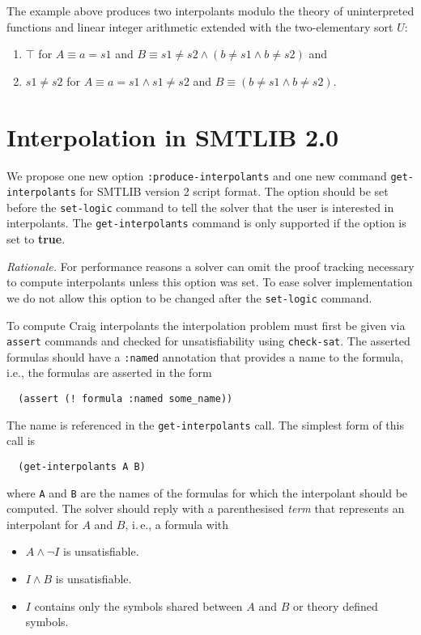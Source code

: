 \documentclass[a4paper,12pt]{article}
\begin{document}
The example above produces two interpolants modulo the theory of uninterpreted
functions and linear integer arithmetic extended with the two-elementary sort
$U$:
\begin{enumerate}
\item $\top$ for $A\equiv a = s1$ and $B\equiv s1\ne s2\wedge(b\ne s1\wedge
  b\ne s2)$ and
\item $s1 \ne s2$ for $A\equiv a = s1\wedge s1\ne s2$ and $B\equiv(b\ne
  s1\wedge b\ne s2)$.
\end{enumerate}

\section {Interpolation in SMTLIB 2.0}

We propose one new option \texttt{:produce-interpolants} and one new
command \texttt{get-interpolants} for SMTLIB version 2 script format.
The option should be set before the \texttt{set-logic} command to tell
the solver that the user is interested in interpolants.  The
\texttt{get-interpolants} command is only supported if the option is
set to \textbf{true}. 

\emph{Rationale.} For performance reasons a solver can omit the proof
tracking necessary to compute interpolants unless this option was set.
To ease solver implementation we do not allow this option to be
changed after the \texttt{set-logic} command.

To compute Craig interpolants the interpolation problem must first be
given via \texttt{assert} commands and checked for unsatisfiability
using \texttt{check-sat}.  The asserted formulas should have a
\texttt{:named} annotation that provides a name to the formula, i.e., 
the formulas are asserted in the form
\begin{verbatim}
  (assert (! formula :named some_name))
\end{verbatim}
The name is referenced in the \texttt{get-interpolants} call.  
%
The simplest form of this call is
\begin{verbatim}
  (get-interpolants A B)
\end{verbatim}
where \texttt{A} and \texttt{B} are the names of the formulas for which
the interpolant should be computed.  The solver should reply with a
parenthesised \emph{term} that represents an interpolant for $A$ and
$B$, i.\,e., a formula with
\begin{itemize}
\item $A \land \lnot I$ is unsatisfiable.
\item $I \land B$ is unsatisfiable.
\item $I$ contains only the symbols shared between $A$ and $B$ or
  theory defined symbols.
\end{itemize}
\end{document}
